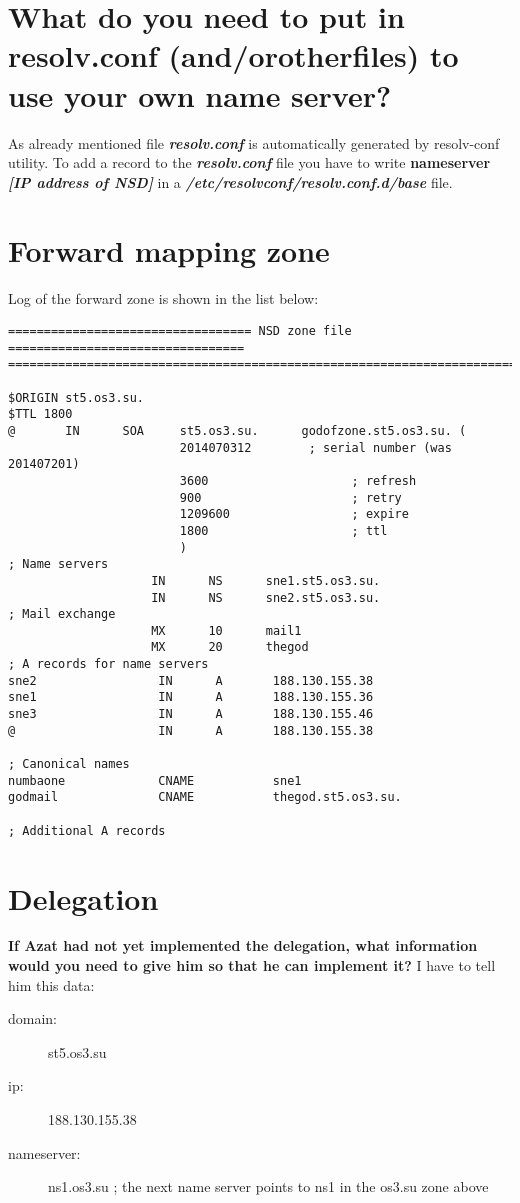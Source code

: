 \documentclass[a4paper]{article}
\newcommand\tab[1][1cm]{\hspace*{#1}}
\begin{document}
\section{What do you need to put in resolv.conf (and/orotherfiles) to use your own name server?}
\tab As already mentioned file \textbf{\textit{resolv.conf}} is automatically generated by resolv-conf utility. To add a record to the \textbf{\textit{resolv.conf}} file you have to write \textbf{nameserver  \textit{ [IP address of NSD]} } 
in a \textbf{\textit{/etc/resolvconf/resolv.conf.d/base}} file. 

\section{Forward mapping zone}
\tab Log of the forward zone is shown in the list below:

\begin{verbatim}
================================== NSD zone file =================================
==================================================================================

$ORIGIN st5.os3.su.
$TTL 1800
@       IN      SOA     st5.os3.su.      godofzone.st5.os3.su. (
                        2014070312        ; serial number (was 201407201)
                        3600                    ; refresh
                        900                     ; retry
                        1209600                 ; expire
                        1800                    ; ttl
                        )
; Name servers
                    IN      NS      sne1.st5.os3.su.
                    IN      NS      sne2.st5.os3.su.
; Mail exchange
                    MX		10		mail1
                    MX		20 		thegod
; A records for name servers
sne2                 IN      A       188.130.155.38
sne1                 IN      A       188.130.155.36
sne3				 IN 	 A  	 188.130.155.46
@                    IN      A       188.130.155.38

; Canonical names 
numbaone			 CNAME			 sne1
godmail				 CNAME			 thegod.st5.os3.su.

; Additional A records

\end{verbatim}

\section{Delegation}
\tab \textbf{If Azat had not yet implemented the delegation, what information would you need to give him so that he can implement it?} \newline \newline I have to tell him this data:
\begin{description}
	\item[\tab domain:] st5.os3.su
	\item[\tab ip:] 188.130.155.38
	\item[\tab nameserver:] ns1.os3.su ; the next name server points to ns1 in the os3.su zone above
\end{description}
\end{document}
